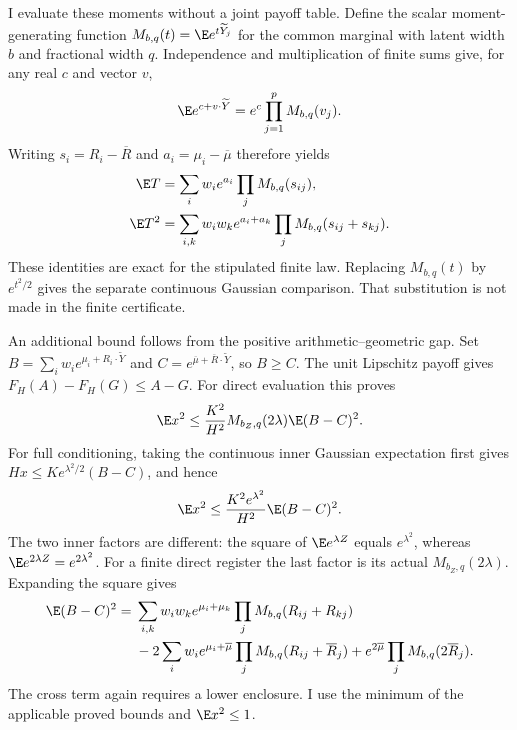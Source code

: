I evaluate these moments without a joint payoff table. Define the scalar
moment-generating function $M_{b,q}(t)=\E e^{t\widetilde Y_j}$ for the
common marginal with latent width $b$ and fractional width $q$. Independence
and multiplication of finite sums give, for any real $c$ and vector $v$,
\begin{equation}\label{eq:finite-exponential}
 \E e^{c+v\cdot\widetilde Y}
 =e^c\prod_{j=1}^pM_{b,q}(v_j).
\end{equation}
Writing $s_i=R_i-\overline R$ and $a_i=\mu_i-\overline\mu$ therefore yields
\begin{align}\label{eq:finite-t-moments}
 \E T&=\sum_iw_i e^{a_i}\prod_jM_{b,q}(s_{ij}),\\
 \E T^2&=\sum_{i,k}w_iw_k e^{a_i+a_k}
                  \prod_jM_{b,q}(s_{ij}+s_{kj}).
\end{align}
These identities are exact for the stipulated finite law. Replacing
$M_{b,q}(t)$ by $e^{t^2/2}$ gives the separate continuous Gaussian
comparison. That substitution is not made in the finite certificate.

An additional bound follows from the positive arithmetic--geometric gap.
Set $B=\sum_iw_i e^{\mu_i+R_i\cdot\widetilde Y}$ and
$C=e^{\overline\mu+\overline R\cdot\widetilde Y}$, so $B\geq C$.
The unit Lipschitz payoff gives $F_H(A)-F_H(G)\leq A-G$.
For direct evaluation this proves
\begin{equation}\label{eq:second-direct}
 \E x^2\leq \frac{K^2}{H^2}M_{b_Z,q}(2\lambda)
                       \E(B-C)^2.
\end{equation}
For full conditioning, taking the continuous inner Gaussian expectation
first gives $Hx\leq K e^{\lambda^2/2}(B-C)$, and hence
\begin{equation}\label{eq:second-condition-AG}
 \E x^2\leq\frac{K^2e^{\lambda^2}}{H^2}\E(B-C)^2.
\end{equation}
The two inner factors are different: the square of
$\E e^{\lambda Z}$ equals $e^{\lambda^2}$, whereas
$\E e^{2\lambda Z}=e^{2\lambda^2}$. For a finite direct register the
last factor is its actual $M_{b_Z,q}(2\lambda)$.
Expanding the square gives
\begin{align}
 \E(B-C)^2={}&
 \sum_{i,k}w_iw_k e^{\mu_i+\mu_k}
      \prod_jM_{b,q}(R_{ij}+R_{kj})\\
 &-2\sum_iw_i e^{\mu_i+\overline\mu}
      \prod_jM_{b,q}(R_{ij}+\overline R_j)
 +e^{2\overline\mu}\prod_jM_{b,q}(2\overline R_j).
\end{align}
The cross term again requires a lower enclosure. I use the minimum of the
applicable proved bounds and $\E x^2\leq1$.

